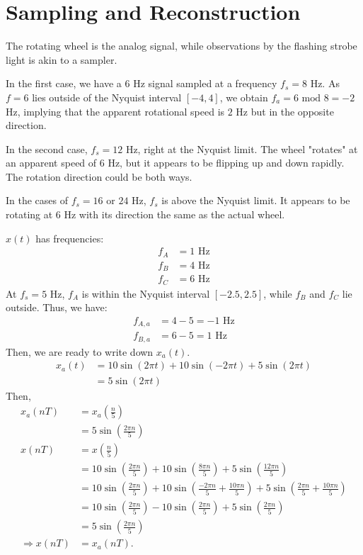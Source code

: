 \section{Sampling and Reconstruction}

\begin{itemize}

The rotating wheel is the analog signal, while observations by
the flashing strobe light is akin to a sampler.

In the first case,
we have a $6$ Hz signal sampled at a frequency $f_s = 8$ Hz. As
$f = 6$ lies outside of the Nyquist interval $[-4,4]$, we obtain
$f_a = 6 \text{ mod } 8 = -2$ Hz, implying that the apparent rotational speed
is $2$ Hz but in the opposite direction.

In the second case, $f_s = 12$ Hz, right at the Nyquist limit.
The wheel "rotates" at an apparent speed of $6$ Hz, but it appears
to be flipping up and down rapidly. The rotation direction could be both ways.

In the cases of $f_s = 16$ or $24$ Hz, $f_s$ is above the Nyquist limit.
It appears to be rotating at $6$ Hz with its direction the same
as the actual wheel.





$x(t)$ has frequencies:
\begin{align*}
	f_A &= 1 \text{ Hz} \\
	f_B &= 4 \text{ Hz} \\
	f_C &= 6 \text{ Hz}
\end{align*}
At $f_s = 5$ Hz, $f_A$ is within the Nyquist interval $[-2.5,2.5]$, while
$f_B$ and $f_C$ lie outside. Thus, we have:
\begin{align*}
	f_{A,a} &= 4-5 = -1 \text{ Hz} \\
	f_{B,a} &= 6-5 = 1 \text{ Hz}
\end{align*}
Then, we are ready to write down $x_a(t)$.
\begin{align*}
	x_a(t) &= 10\sin(2\pi t) + 10\sin(-2\pi t) + 5\sin(2\pi t) \\
		   &= 5\sin(2\pi t)
\end{align*}
Then,
\begin{align*}
	x_a(nT) &= x_a\left(\frac{n}{5}\right) \\
			&= 5\sin\left(\frac{2\pi n}{5}\right) \\
	x(nT)	&= x\left(\frac{n}{5}\right) \\
			&= 10\sin\left(\frac{2\pi n}{5}\right) + 10\sin\left(\frac{8\pi n}{5}\right) + 5\sin\left(\frac{12\pi n}{5}\right) \\
			&= 10\sin\left(\frac{2\pi n}{5}\right) + 10\sin\left(\frac{-2\pi n}{5}+\frac{10\pi n}{5}\right) + 5\sin\left(\frac{2\pi n}{5}+\frac{10\pi n}{5}\right) \\
			&= 10\sin\left(\frac{2\pi n}{5}\right) - 10\sin\left(\frac{2\pi n}{5}\right) + 5\sin\left(\frac{2\pi n}{5}\right) \\
			&= 5\sin\left(\frac{2\pi n}{5}\right) \\
	\Rightarrow x(nT) &= x_a(nT)\text{.}
\end{align*}


\end{itemize}
